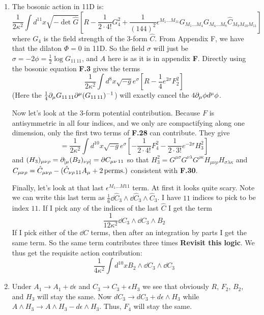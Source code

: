 \documentclass[11pt, class=article, crop=false]{standalone}
\begin{document}
\begin{enumerate}
	
	\item The bosonic action in 11D is:
	\[
		\frac{1}{2\kappa^2} \int d^{11} x \sqrt{-\det \hat G} \left[R - \frac{1}{2 \cdot 4!} G_4^2 + \frac{1}{(144)^2} \epsilon^{M_1 \dots M_{11}} G_{M_1 \dots M_4} G_{M_4 \dots M_8} \hat C_{M_9 M_{10} M_{11}}\right]
	\]
	where $G_4$ is the field strength of the 3-form $\hat C$. From Appendix F, we have that the dilaton $\Phi = 0$ in 11D. So the field $\sigma$ will just be $\sigma = -2\phi = \frac12 \log G_{11\, 11}$, and $A$ here is as it is in appendix \textbf{F}. Directly using the bosonic equation \textbf{F.3} gives the terms
	\[
		\frac{1}{2\kappa^2 }\int d^8 x \sqrt{-g} e^{\sigma} \left[R - \frac14 e^{2\sigma} F_2^2  \right]
	\]
	(Here the $\frac14 \partial_\mu G_{11\, 11} \partial^\mu (G_{11\, 11})^{-1}$) will exactly cancel the $4 \partial_\mu \phi d^\mu \phi$. 
	
	Now let's look at the $3$-form potential contribution. Because $F$ is antisymmetric in all four indices, and we only are compactifying along one dimension, only the first two terms of \textbf{F.28} can contribute. They give
	\[
		=\frac{1}{2\kappa^2} \int d^{10} x \sqrt{-g} e^\sigma \left[-\frac{1}{2 \cdot 4!} F_4^2 - \frac{1}{2 \cdot 3!} e^{-2\sigma} H_3^2 \right]
	\]
	and $(H_3)_{\mu \nu \rho} = \partial_{[\mu} (B_2)_{\nu \rho]} = \partial C_{\mu \nu\, 11}$ so that $H_3^2 = G^{\mu \sigma} G^{\nu \lambda} G^{\rho \kappa} H_{\mu \nu \rho} H_{\sigma \lambda \kappa}$ and $C_{\mu \nu \rho} = \hat C_{\mu \nu \rho} - (\hat C_{\nu \rho\, 11} A_\mu + 2 \,\mathrm{perms.})$  consistent with \textbf{F.30}.

	Finally, let's look at that last $\epsilon^{M_1 \dots M{11}}$ term. At first it looks quite scary. Note we can write this last term as $\frac16 \dd \hat C_3 \wedge \dd \hat C_3 \wedge \hat C_3$. I have $11$ indices to pick to be index $11$. If I pick any of the indices of the last $\hat C$ I get the term
	\[
		\frac{1}{12 \kappa^2} \dd C_3 \wedge \dd C_3 \wedge B_2
	\]
	If I pick either of the $\dd C$ terms, then after an integration by parts I get the same term. So the same term contributes three times \textbf{Revisit this logic}. We thus get the requisite action contribution:
	\[
		\frac{1}{4\kappa^2} \int d^{10} x B_2 \wedge \dd C_3 \wedge \dd C_3
	\]
	\item Under $A_1 \to A_1 + \dd \epsilon$ and $C_3 \to C_3 + \epsilon H_3$ we see that obviously $R$, $F_2$, $B_2$, and $H_3$ will stay the same. Now $dC_3 \to dC_3 + d\epsilon \wedge H_3$ while $A \wedge H_3 \to A \wedge H_3 - d \epsilon \wedge H_3$. Thus, $F_4$ will stay the same. 
	

\end{enumerate}
\end{document}
